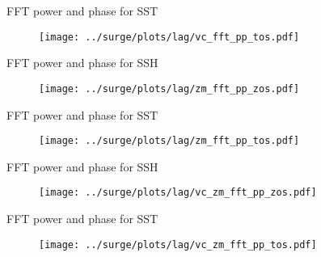 \begin{frame}{FFT power and phase for SST}
\vspace{-20pt}
\begin{figure}
\texttt{[image: ../surge/plots/lag/vc\_fft\_pp\_tos.pdf]}
\caption{}
\end{figure}
\end{frame}


\begin{frame}{FFT power and phase for SSH}
\vspace{-20pt}
\begin{figure}
\texttt{[image: ../surge/plots/lag/zm\_fft\_pp\_zos.pdf]}
\caption{}
\end{figure}
\end{frame}


\begin{frame}{FFT power and phase for SST}
\vspace{-20pt}
\begin{figure}
\texttt{[image: ../surge/plots/lag/zm\_fft\_pp\_tos.pdf]}
\caption{}
\end{figure}
\end{frame}


\begin{frame}{FFT power and phase for SSH}
\vspace{-20pt}
\begin{figure}
\texttt{[image: ../surge/plots/lag/vc\_zm\_fft\_pp\_zos.pdf]}
\caption{}
\end{figure}
\end{frame}

\begin{frame}{FFT power and phase for SST}
\vspace{-20pt}
\begin{figure}
\texttt{[image: ../surge/plots/lag/vc\_zm\_fft\_pp\_tos.pdf]}
\caption{}
\end{figure}
\end{frame}
